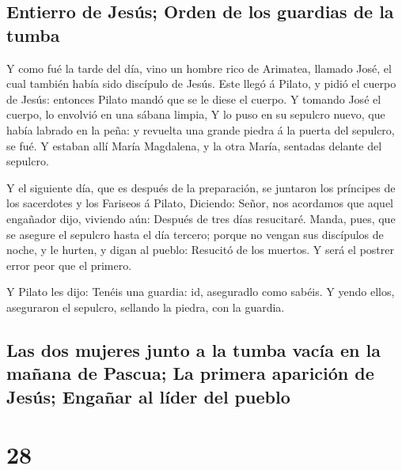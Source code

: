 \hypertarget{entierro-de-jesuxfas-orden-de-los-guardias-de-la-tumba}{%
\subsection{Entierro de Jesús; Orden de los guardias de la
tumba}\label{entierro-de-jesuxfas-orden-de-los-guardias-de-la-tumba}}

 Y como fué la tarde del día, vino un hombre rico de
Arimatea, llamado José, el cual también había sido discípulo de Jesús.
 Este llegó á Pilato, y pidió el cuerpo de Jesús: entonces
Pilato mandó que se le diese el cuerpo.  Y tomando José el
cuerpo, lo envolvió en una sábana limpia,  Y lo puso en su
sepulcro nuevo, que había labrado en la peña: y revuelta una grande
piedra á la puerta del sepulcro, se fué.  Y estaban allí
María Magdalena, y la otra María, sentadas delante del sepulcro.

 Y el siguiente día, que es después de la preparación, se
juntaron los príncipes de los sacerdotes y los Fariseos á Pilato,
 Diciendo: Señor, nos acordamos que aquel engañador dijo,
viviendo aún: Después de tres días resucitaré.  Manda,
pues, que se asegure el sepulcro hasta el día tercero; porque no vengan
sus discípulos de noche, y le hurten, y digan al pueblo: Resucitó de los
muertos. Y será el postrer error peor que el primero.

 Y Pilato les dijo: Tenéis una guardia: id, aseguradlo como
sabéis.  Y yendo ellos, aseguraron el sepulcro, sellando la
piedra, con la guardia.

\hypertarget{las-dos-mujeres-junto-a-la-tumba-vacuxeda-en-la-mauxf1ana-de-pascua-la-primera-apariciuxf3n-de-jesuxfas-engauxf1ar-al-luxedder-del-pueblo}{%
\subsection{Las dos mujeres junto a la tumba vacía en la mañana de
Pascua; La primera aparición de Jesús; Engañar al líder del
pueblo}\label{las-dos-mujeres-junto-a-la-tumba-vacuxeda-en-la-mauxf1ana-de-pascua-la-primera-apariciuxf3n-de-jesuxfas-engauxf1ar-al-luxedder-del-pueblo}}

\hypertarget{section-27}{%
\section{28}\label{section-27}}

